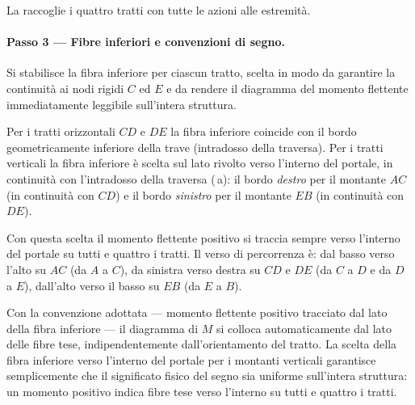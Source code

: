 La  raccoglie i quattro tratti con
tutte le azioni alle estremità.





\paragraph{Passo 3 --- Fibre inferiori e convenzioni di segno.}

Si stabilisce la fibra inferiore per ciascun tratto,
scelta in modo da garantire la continuità ai nodi rigidi
$C$ ed $E$ e da rendere il diagramma del momento flettente
immediatamente leggibile sull'intera struttura.

Per i tratti orizzontali $CD$ e $DE$ la fibra inferiore
coincide con il bordo geometricamente inferiore della trave
(intradosso della traversa).
Per i tratti verticali la fibra inferiore è scelta sul lato
rivolto verso l'interno del portale, in continuità con
l'intradosso della traversa (\,a):
il bordo \emph{destro} per il montante $AC$
(in continuità con $CD$) e il bordo \emph{sinistro}
per il montante $EB$ (in continuità con $DE$).

Con questa scelta il momento flettente positivo si traccia
sempre verso l'interno del portale su tutti e quattro i tratti.
Il verso di percorrenza è:
dal basso verso l'alto su $AC$ (da $A$ a $C$),
da sinistra verso destra su $CD$ e $DE$ (da $C$ a $D$
e da $D$ a $E$),
dall'alto verso il basso su $EB$ (da $E$ a $B$).

\begin{oss}
	Con la convenzione adottata --- momento flettente
	positivo tracciato dal lato della fibra inferiore
	--- il diagramma di $M$ si colloca automaticamente
	dal lato delle fibre tese, indipendentemente
	dall'orientamento del tratto. La scelta della fibra
	inferiore verso l'interno del portale per i montanti
	verticali garantisce semplicemente che il significato
	fisico del segno sia uniforme sull'intera struttura:
	un momento positivo indica fibre tese verso l'interno
	su tutti e quattro i tratti.
\end{oss}



